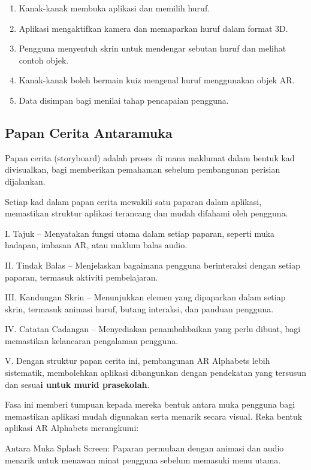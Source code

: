 \begin{itemize}
\begin{itemize}
\begin{itemize}
\begin{itemize}
\begin{itemize}
\begin{itemize}
\begin{itemize}
\begin{itemize}
\begin{flushleft}
\begin{enumerate}[label=\arabic*.]
    \item Kanak-kanak membuka aplikasi dan memilih huruf.
    \item Aplikasi mengaktifkan kamera dan memaparkan huruf dalam format 3D.
    \item Pengguna menyentuh skrin untuk mendengar sebutan huruf dan melihat contoh objek.
    \item Kanak-kanak boleh bermain kuiz mengenal huruf menggunakan objek AR.
    \item Data disimpan bagi menilai tahap pencapaian pengguna.
\end{enumerate}




\subsection{Papan Cerita Antaramuka}

Papan cerita (storyboard) adalah proses di mana maklumat dalam bentuk kad divisualkan, bagi memberikan pemahaman sebelum pembangunan perisian dijalankan.

Setiap kad dalam papan cerita mewakili satu paparan dalam aplikasi, memastikan struktur aplikasi terancang dan mudah difahami oleh pengguna.

I. Tajuk – Menyatakan fungsi utama dalam setiap paparan, seperti muka hadapan, imbasan AR, atau maklum balas audio.

II. Tindak Balas – Menjelaskan bagaimana pengguna berinteraksi dengan setiap paparan, termasuk aktiviti pembelajaran.

III. Kandungan Skrin – Menunjukkan elemen yang dipaparkan dalam setiap skrin, termasuk animasi huruf, butang interaksi, dan panduan pengguna.

IV. Catatan Cadangan – Menyediakan penambahbaikan yang perlu dibuat, bagi memastikan kelancaran pengalaman pengguna.

V. Dengan struktur papan cerita ini, pembangunan AR Alphabets lebih sistematik, membolehkan aplikasi dibangunkan dengan pendekatan yang tersusun dan sesua\textbf{\textbf{i untuk murid prasekolah}}.

Fasa ini memberi tumpuan kepada mereka bentuk antara muka pengguna bagi memastikan aplikasi mudah digunakan serta menarik secara visual. Reka bentuk aplikasi AR Alphabets merangkumi:

Antara Muka Splash Screen: Paparan permulaan dengan animasi dan audio menarik untuk menawan minat pengguna sebelum memasuki menu utama.


\end{flushleft}
\end{itemize}
\end{itemize}
\end{itemize}
\end{itemize}
\end{itemize}
\end{itemize}
\end{itemize}
\end{itemize}

